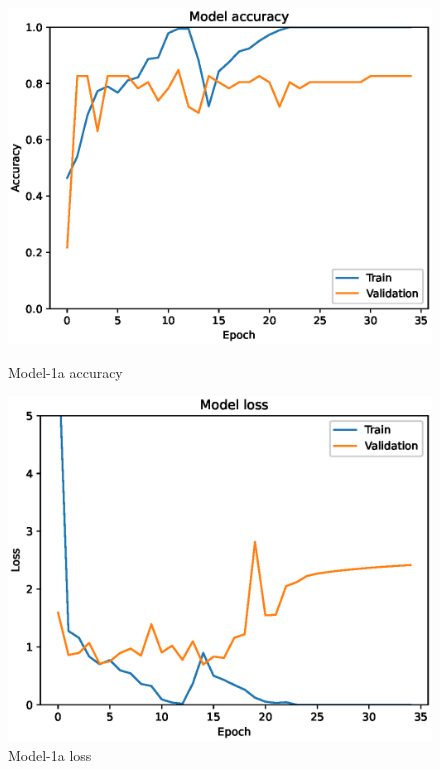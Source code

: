 \begin{figure}
    \centering
    \begin{minipage}{0.45\textwidth}
        \centering
        \includegraphics[width=\textwidth]{./fig/accuracy1a.eps}
        \caption{Model-1a accuracy}
        \label{fig:model1_acc}
    \end{minipage}
    \begin{minipage}{0.45\textwidth}
        \centering
        \includegraphics[width=\textwidth]{./fig/loss1a.eps}
        \caption{Model-1a loss}
        \label{fig:model1_loss}
    \end{minipage}
\end{figure}

